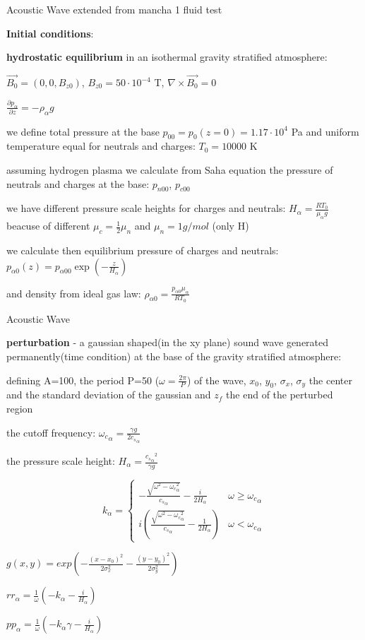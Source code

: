 \documentclass{beamer}
\begin{document}
\begin{frame}{Acoustic Wave}
extended from mancha 1 fluid test

\textbf{Initial conditions}:

\textbf{hydrostatic equilibrium} in an isothermal gravity stratified atmosphere:

$\vec{B_0}=(0,0,B_{z0})$, $B_{z0} = 50 \cdot 10^{-4}$ T, $\nabla \times \vec{B_0} = 0$

$\frac{\partial p_\alpha}{\partial z} = -\rho_\alpha  g$

we define total pressure at the  base  $p_{00}= p_0(z=0)=1.17 \cdot 10^4$ Pa  and uniform temperature equal for neutrals and charges: $T_0=10000$ K

assuming hydrogen plasma we calculate from Saha equation the pressure of neutrals and charges at the base: $p_{n00}$, $p_{c00}$

we have different pressure scale heights for charges and neutrals: $H_\alpha = \frac{R T_0}{\mu_\alpha g}$ beacuse of different $\mu_c=\frac{1}{2} \mu_n$  and $\mu_n = 1g/mol$ (only H)

we calculate then equilibrium pressure of charges and neutrals: $p_{\alpha0}(z) = p_{\alpha00} \exp(-\frac{z}{H_\alpha})$

and density from ideal gas law: $\rho_{\alpha0} = \frac{p_{\alpha0} \mu_\alpha}{R T_0}$
\end{frame}




\begin{frame}{Acoustic Wave}

\textbf{perturbation} - a gaussian shaped(in the xy plane) sound wave generated permanently(time condition) at the base of the gravity stratified atmosphere:

defining  A=100, the period P=50  ($\omega=\frac{2 \pi}{P}$) of the wave, $x_0$, $y_0$, $\sigma_x$, $\sigma_y$ the center and the standard deviation of the gaussian and
 $z_f$ the end of the perturbed region 

the cutoff frequency: ${\omega_c}_\alpha = \frac{\gamma g}{2 {c_s}_\alpha}$

the pressure scale height: $H_\alpha=\frac{{{c_s}_\alpha}^2}{\gamma g}$


\[
k_\alpha=
 \begin{cases} 
      -\frac{\sqrt{\omega^2 - {\omega_c}_\alpha^2}}{{c_s}_\alpha} - \frac{i}{2 H_\alpha}& \omega \ge {\omega_c}_\alpha \\
      i(\frac{\sqrt{\omega^2 - {\omega_c}_\alpha^2}}{{c_s}_\alpha} - \frac{1}{2 H_\alpha})& \omega < {\omega_c}_\alpha 
   \end{cases}
\]

$g(x,y) = exp(-\frac{(x-x_0)^2}{2 \sigma_x^2} -\frac{(y-y_0)^2}{2 \sigma_y^2} )$

$rr_\alpha = \frac{1}{\omega}(-k_\alpha - \frac{i}{H_\alpha})$

$pp_\alpha = \frac{1}{\omega}(-k_\alpha \gamma - \frac{i}{H_\alpha})$

\end{frame}
\end{document}
